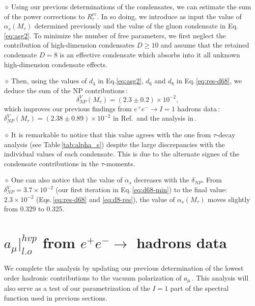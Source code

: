 \documentclass[review]{elsarticle}
\def\beq{\begin{equation}}
\def\eeq{\end{equation}}
\def\d{$\diamond~$}
\begin{document}
\d  Using our previous determinations of the condensates, we can estimate the sum of the power corrections to $R^{ee}_{\tau}$.
   In so doing, we introduce as input the value of $\alpha_s(M_\tau)$ determined previously and the value of the gluon condensate in Eq.\,\ref{eq:asg2}. To minimize the number of free parameters, we first neglect the contribution of high-dimension condensates $D\geq 10$ and assume that the retained condensate $D=8$ is an effective condensate which absorbs into it all unknown high-dimension condensate effects. 
   
 
\d  Then, using the values of $d_4$ in Eq.\ref{eq:asg2}, $d_6$ and $d_8$ in Eq.\,\ref{eq:res-d68}, we deduce the sum of the NP contributions\,:
\beq
\delta^V_{NP}(M_\tau)= (2.3\pm 0.2)\times 10^{-2},
\eeq
which improves our previous findings from $e^+e^-\to I=1$ hadrons data\,: $\delta^V_{NP}(M_\tau)= (2.38\pm 0.89)\times 10^{-2}$ in Ref.\,\cite{SN95} and the analysis in\,\cite{SNTAU}.  

\d It is remarkable to notice that this value agrees with the one from $\tau$-decay analysis (see Table\,\ref{tab:alpha_s}) despite the large discrepancies with the individual values of each condensate.  This is due to the alternate signes of the condensate contributions in the $\tau$-moments.

\d One can also notice that the value of $\alpha_s$ decreases with the $\delta_{NP}$.  From $\delta^V_{NP}=3.7\times 10^{-2}$  (our first iteration in Eq.\,\ref{eq:d68-min}) to the final value: $2.3 \times 10^{-2}$ (Eqs.\,\ref{eq:res-d68} and \ref{eq:d8-res}), the value of $\alpha_s(M_\tau)$ moves slightly  from 0.329 to 0.325. 

\section{$a_\mu\vert^{hvp}_{l.o}$ from   $e^+e^-\to$ hadrons data}
We complete the analysis by updating our previous determination of the  lowest order hadronic contributions  to the vacuum polarization of $a_\mu$\,\cite{SNamu}.  This analysis will also serve as a test of our parametrization of the $I=1$ part of the spectral function used in previous sections. 
\end{document}
